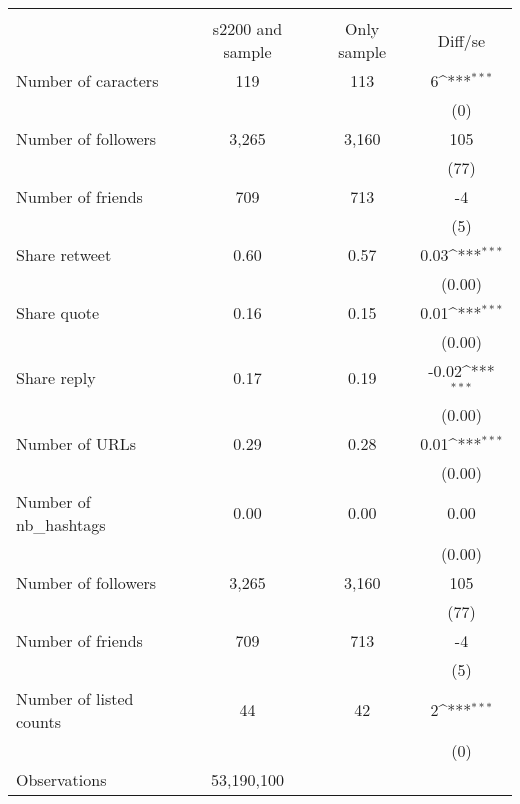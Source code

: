 {
\def\sym#1{\ifmmode^{#1}\else\(^{#1}\)\fi}
\begin{tabular}{l*{1}{ccc}}
\hline\hline
                    &\multicolumn{3}{c}{}                           \\
                    &s2200 and sample& Only sample&     Diff/se         \\
\hline
Number of caracters &         119&         113&           6\sym{***}\\
                    &            &            &         (0)         \\
Number of followers &       3,265&       3,160&         105         \\
                    &            &            &        (77)         \\
Number of friends   &         709&         713&          -4         \\
                    &            &            &         (5)         \\
Share retweet       &        0.60&        0.57&        0.03\sym{***}\\
                    &            &            &      (0.00)         \\
Share quote         &        0.16&        0.15&        0.01\sym{***}\\
                    &            &            &      (0.00)         \\
Share reply         &        0.17&        0.19&       -0.02\sym{***}\\
                    &            &            &      (0.00)         \\
Number of URLs      &        0.29&        0.28&        0.01\sym{***}\\
                    &            &            &      (0.00)         \\
Number of nb\_hashtags&        0.00&        0.00&        0.00         \\
                    &            &            &      (0.00)         \\
Number of followers &       3,265&       3,160&         105         \\
                    &            &            &        (77)         \\
Number of friends   &         709&         713&          -4         \\
                    &            &            &         (5)         \\
Number of listed counts&          44&          42&           2\sym{***}\\
                    &            &            &         (0)         \\
\hline
Observations        &  53,190,100&            &                     \\
\hline\hline
\end{tabular}
}
